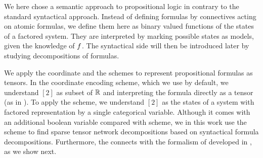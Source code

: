 We here chose a semantic approach to propositional logic in contrary to the standard syntactical approach.
Instead of defining formulas by connectives acting on atomic formulas, we define them here as binary valued functions of the states of a factored system.
They are interpreted by marking possible states as models, given the knowledge of $f$.
The syntactical side will then be introduced later by studying decompositions of formulas.



We apply the coordinate and the \basisEncoding{} schemes to represent propositional formulas as tensors.
In the coordinate encoding scheme, which we use by default, we understand $[2]$ as subset of $\mathbb{R}$ and interpreting the formula directly as a tensor (as in ).
To apply the \basisEncoding{} scheme, we understand $[2]$ as the states of a system with factored representation by a single categorical variable.
Although it comes with an additional boolean variable compared with \coordinateEncoding{} scheme, we in this work use the \basisEncoding{} scheme to find sparse tensor network decompositions based on syntactical formula decompositions.
Furthermore, the \basisEncoding{} connects with the formalism of \ComputationActivationNetworks{} developed in , as we show next.

